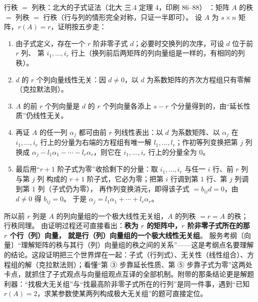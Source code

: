 \begin{fdeep}{行秩 $=$ 列秩：北大的子式证法（北大 三.4 定理 4，印刷 86--88）}
：矩阵 $A$ 的秩 $=$ 列秩 $=$ 行秩（行与列的情形完全对称，只证一半即可）。
设 $A$ 为 $s\times n$ 矩阵，$r(A)=r$，证明按五步走：
\begin{enumerate}[leftmargin=2.2em,itemsep=0.22em]
\item 由子式定义，存在一个 $r$ 阶非零子式 $d$；必要时交换列的次序，可设 $d$ 位于前 $r$ 列、
      第 $i_1,\dots,i_r$ 行上（换列前后两矩阵的列向量组是一样的，有相同的列秩）。
\item $d$ 的 $r$ 个列向量线性无关：因 $d\ne0$，以 $d$ 为系数矩阵的齐次方程组只有零解（克拉默法则）。
\item $A$ 的前 $r$ 个列向量是 $d$ 的 $r$ 个列向量各添上 $s-r$ 个分量得到的，由“延长性质”仍线性无关。
\item 再证 $A$ 的任一列 $\alpha_j$ 都可由前 $r$ 列线性表出：以 $d$ 为系数矩阵、以 $\alpha_j$ 在
      $i_1,\dots,i_r$ 行上的分量为右端的方程组有唯一解 $l_1,\dots,l_r$；作初等列变换把第 $j$ 列换成
      $\alpha_j-l_1\alpha_1-\cdots-l_r\alpha_r$，则它在 $i_1,\dots,i_r$ 行上的分量全为 $0$。
\item 最后用“$r+1$ 阶子式为零”收拾剩下的分量：取 $i_1,\dots,i_r$ 与任一 $i$ 行、前 $r$ 列与第 $j$ 列
      构成的 $r+1$ 阶子式，它必为零；把第 $i$ 行调到第 $1$ 行、第 $j$ 列调到第 $1$ 列（子式仍为零），
      再作列变换消元，即得该子式 $=b_{ij}d=0$，由 $d\ne0$ 得 $b_{ij}=0$。
      于是 $\alpha_j=l_1\alpha_1+\cdots+l_r\alpha_r$。
\end{enumerate}
所以前 $r$ 列是 $A$ 的列向量组的一个极大线性无关组，$A$ 的列秩 $=r=A$ 的秩；行秩同理。
由证明过程还可直接看出：\textbf{秩为 $r$ 的矩阵中，$r$ 阶非零子式所在的那 $r$ 个行（列）向量，
就是行（列）向量组的一个极大线性无关组}。
\fbref{}服务考纲〔向量〕“理解矩阵的秩与其行（列）向量组的秩之间的关系”——这是考纲点名要理解的结论。这段证明把三个世界焊在一起：子式（行列式）、无关性（线性组合）、方程组的解（克拉默法则）；看懂“第 ③ 步靠延长性质、第 ⑤ 步靠子式为零”这两处卡点，就抓住了子式观点与向量组观点互译的全部机制。附带的那条结论更是解题利器：“找极大无关组”与“找最高阶非零子式所在的行列”是同一件事，遇到“已知 $r(A)=2$，求某参数使某两列构成极大无关组”的题可直接定位。
\end{fdeep}

